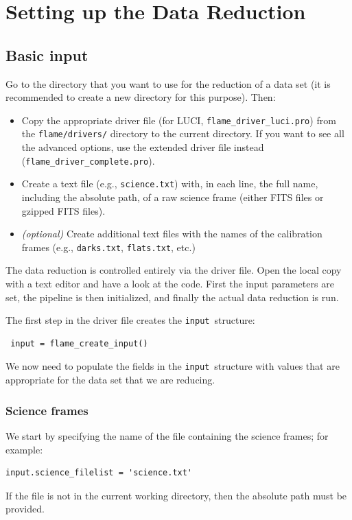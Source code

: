 \documentclass[a4paper]{article}
\newcommand{\inp}{\texttt{input}}
\begin{document}
\section{Setting up the Data Reduction}
\label{sec:setup}


\subsection{Basic input}

Go to the directory that you want to use for the reduction of a data set (it is recommended to create a new directory for this purpose). Then:
\begin{itemize}
\item Copy the appropriate driver file (for LUCI, \texttt{flame\_driver\_luci.pro}) from the \texttt{flame/drivers/} directory to the current directory. If you want to see all the advanced options, use the extended driver file instead\\ (\texttt{flame\_driver\_complete.pro}).
\item Create a text file (e.g., \texttt{science.txt}) with, in each line, the full name, including the absolute path, of a raw science frame (either FITS files or gzipped FITS files).
\item \emph{(optional)} Create additional text files with the names of the calibration frames (e.g., \texttt{darks.txt}, \texttt{flats.txt}, etc.)
\end{itemize}

The data reduction is controlled entirely via the driver file. Open the local copy with a text editor and have a look at the code. First the input parameters are set, the pipeline is then initialized, and finally the actual data reduction is run.

The first step in the driver file creates the \inp\ structure:
\begin{lstlisting}
 input = flame_create_input()
\end{lstlisting}
We now need to populate the fields in the \inp\ structure with values that are appropriate for the data set that we are reducing.

\subsubsection{Science frames}
We start by specifying the name of the file containing the science frames; for example:
\begin{lstlisting}
input.science_filelist = 'science.txt'
\end{lstlisting}
If the file is not in the current working directory, then the absolute path must be provided.
\end{document}
